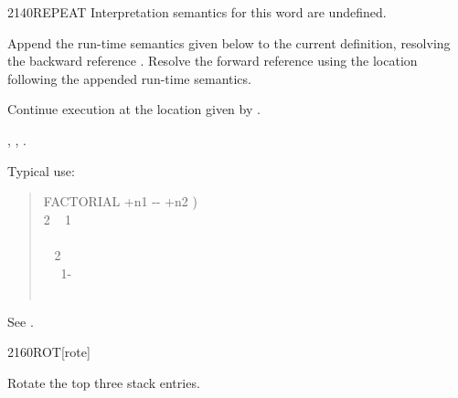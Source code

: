 \begin{worddef}{2140}{REPEAT}
\interpret
	Interpretation semantics for this word are undefined.

\compile

	Append the run-time semantics given below to the current
	definition, resolving the backward reference .
	Resolve the forward reference  using the location
	following the appended run-time semantics.

\runtime
	\stack{}{}

	Continue execution at the location given by .

\see {},
	,
	.

	\begin{rationale} %
		Typical use:
		\begin{quote}\ttfamily
			\word{:} FACTORIAL  +n1 -{}- +n2 ) \\
			\tab {} 2  ~
				 1 ~  \\
			\tab {} \\
			\tab {}~  2   \\
			\tab~~ 1- ~  \word{*}~  \\
			\tab {}  \\
			\word{;}
		\end{quote}
	\end{rationale}

	\begin{testing} %
		See .
	\end{testing}
\end{worddef}


\begin{worddef}{2160}{ROT}[rote]
\item {}

	Rotate the top three stack entries.

	\begin{testing} %
	\end{testing}
\end{worddef}


